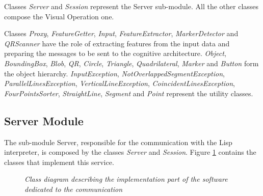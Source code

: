 		Classes \emph{Server} and \emph{Session} represent the Server sub-module.
		All the other classes compose the Visual Operation one.


		Classes \emph{Proxy}, \emph{FeatureGetter}, \emph{Input}, \emph{FeatureExtractor}, \emph{MarkerDetector} and \emph{QRScanner} have the role of extracting features from the input data and preparing the messages to be sent to the cognitive architecture.
		\emph{Object}, \emph{BoundingBox}, \emph{Blob}, \emph{QR}, \emph{Circle}, \emph{Triangle}, \emph{Quadrilateral}, \emph{Marker} and \emph{Button} form the object hierarchy.
		\emph{InputException}, \emph{NotOverlappedSegmentException}, \emph{ParallelLinesException}, \emph{VerticalLineException}, \emph{CoincidentLinesException}, \emph{FourPointsSorter}, \emph{StraightLine}, \emph{Segment} and \emph{Point} represent the utility classes.
	
		
		\subsection{Server Module}
		The sub-module Server, responsible for the communication with the \mbox{Lisp} interpreter, is composed by the classes \emph{Server} and \emph{Session}. 
		Figure \ref{fig:impl_feat_extraction} contains the classes that implement this service.

		\begin{figure}[h]
		  \begin{center} 
		  \end{center} 
		  \caption{\textit{Class diagram describing the implementation part of the software dedicated to the communication}}  
		  \label{fig:impl_feat_extraction}
	 	\end{figure}	

